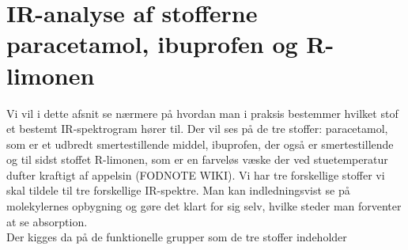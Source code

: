 \section{IR-analyse af stofferne paracetamol, ibuprofen og R-limonen}
Vi vil i dette afsnit se nærmere på hvordan man i praksis bestemmer hvilket stof et bestemt IR-spektrogram hører til. Der vil ses på de tre stoffer: paracetamol, som er et udbredt smertestillende middel, ibuprofen, der også er smertestillende og til sidst stoffet R-limonen, som er en farveløs væske der ved stuetemperatur dufter kraftigt af appelsin (FODNOTE WIKI). Vi har tre forskellige stoffer vi skal tildele til tre forskellige IR-spektre. Man kan indledningsvist se på molekylernes opbygning og gøre det klart for sig selv, hvilke steder man forventer at se absorption. 
\\

Der kigges da på de funktionelle grupper som de tre stoffer indeholder

